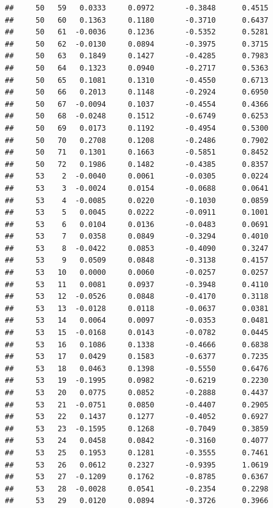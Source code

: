 \documentclass[
]{article}
\begin{document}
\begin{verbatim}
##     50   59   0.0333     0.0972       -0.3848      0.4515 
##     50   60   0.1363     0.1180       -0.3710      0.6437 
##     50   61  -0.0036     0.1236       -0.5352      0.5281 
##     50   62  -0.0130     0.0894       -0.3975      0.3715 
##     50   63   0.1849     0.1427       -0.4285      0.7983 
##     50   64   0.1323     0.0940       -0.2717      0.5363 
##     50   65   0.1081     0.1310       -0.4550      0.6713 
##     50   66   0.2013     0.1148       -0.2924      0.6950 
##     50   67  -0.0094     0.1037       -0.4554      0.4366 
##     50   68  -0.0248     0.1512       -0.6749      0.6253 
##     50   69   0.0173     0.1192       -0.4954      0.5300 
##     50   70   0.2708     0.1208       -0.2486      0.7902 
##     50   71   0.1301     0.1663       -0.5851      0.8452 
##     50   72   0.1986     0.1482       -0.4385      0.8357 
##     53    2  -0.0040     0.0061       -0.0305      0.0224 
##     53    3  -0.0024     0.0154       -0.0688      0.0641 
##     53    4  -0.0085     0.0220       -0.1030      0.0859 
##     53    5   0.0045     0.0222       -0.0911      0.1001 
##     53    6   0.0104     0.0136       -0.0483      0.0691 
##     53    7   0.0358     0.0849       -0.3294      0.4010 
##     53    8  -0.0422     0.0853       -0.4090      0.3247 
##     53    9   0.0509     0.0848       -0.3138      0.4157 
##     53   10   0.0000     0.0060       -0.0257      0.0257 
##     53   11   0.0081     0.0937       -0.3948      0.4110 
##     53   12  -0.0526     0.0848       -0.4170      0.3118 
##     53   13  -0.0128     0.0118       -0.0637      0.0381 
##     53   14   0.0064     0.0097       -0.0353      0.0481 
##     53   15  -0.0168     0.0143       -0.0782      0.0445 
##     53   16   0.1086     0.1338       -0.4666      0.6838 
##     53   17   0.0429     0.1583       -0.6377      0.7235 
##     53   18   0.0463     0.1398       -0.5550      0.6476 
##     53   19  -0.1995     0.0982       -0.6219      0.2230 
##     53   20   0.0775     0.0852       -0.2888      0.4437 
##     53   21  -0.0751     0.0850       -0.4407      0.2905 
##     53   22   0.1437     0.1277       -0.4052      0.6927 
##     53   23  -0.1595     0.1268       -0.7049      0.3859 
##     53   24   0.0458     0.0842       -0.3160      0.4077 
##     53   25   0.1953     0.1281       -0.3555      0.7461 
##     53   26   0.0612     0.2327       -0.9395      1.0619 
##     53   27  -0.1209     0.1762       -0.8785      0.6367 
##     53   28  -0.0028     0.0541       -0.2354      0.2298 
##     53   29   0.0120     0.0894       -0.3726      0.3966 

\end{verbatim}
\end{document}
